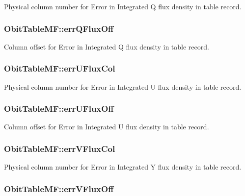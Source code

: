 Physical column number for Error in Integrated Q flux density in table record. 

\subsubsection{ {\bf Obit\-Table\-MF::err\-QFlux\-Off}}\label{structObitTableMF_o56}


Column offset for Error in Integrated Q flux density in table record. 

\subsubsection{ {\bf Obit\-Table\-MF::err\-UFlux\-Col}}\label{structObitTableMF_o59}


Physical column number for Error in Integrated U flux density in table record. 

\subsubsection{ {\bf Obit\-Table\-MF::err\-UFlux\-Off}}\label{structObitTableMF_o58}


Column offset for Error in Integrated U flux density in table record. 

\subsubsection{ {\bf Obit\-Table\-MF::err\-VFlux\-Col}}\label{structObitTableMF_o61}


Physical column number for Error in Integrated Y flux density in table record. 

\subsubsection{ {\bf Obit\-Table\-MF::err\-VFlux\-Off}}\label{structObitTableMF_o60}


